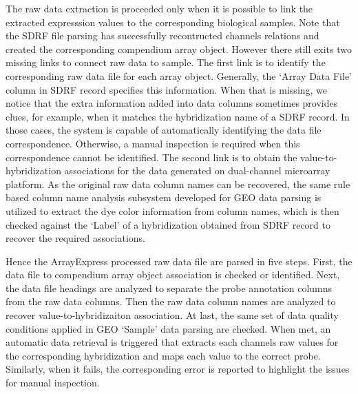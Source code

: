 The raw data extraction is proceeded only when it is possible to link the
extracted expresssion values to the corresponding biological samples.
%
Note that the SDRF file parsing has successfully recontructed channels
relations and created the corresponding compendium array object.
%
However there still exits two missing links to connect raw data to sample.
%
The first link is to identify the corresponding raw data file for each array
object.  Generally, the `Array Data File' column in SDRF record specifies
this information.
%
When that is missing, we notice that the extra information added into
data columns sometimes provides clues, for example, when it matches the
hybridization name of a SDRF record.
%
In those cases, the system is capable of automatically identifying the data
file correspondence.
%
Otherwise, a manual inspection is required when this correspondence cannot be
identified.
%
The second link is to obtain the value-to-hybridization associations for the
data generated on dual-channel microarray platform.
%
As the original raw data column names can be recovered, the same rule based
column name analysis subsystem developed for GEO data parsing is utilized to
extract the dye color information from column names, which is then checked
against the `Label' of a hybridization obtained from SDRF record to recover
the required associations.

Hence the ArrayExpress processed raw data file are parsed in five steps.
%
First, the data file to compendium array object association is checked or
identified.  Next, the data file headings are analyzed to separate the probe
annotation columns from the raw data columns.  Then the raw data column names
are analyzed to recover value-to-hybridizaiton association.  At last, the same
set of data quality conditions applied in GEO `Sample' data parsing are
checked.  When met, an automatic data retrieval is triggered that extracts
each channels raw values for the corresponding hybridization and maps each
value to the correct probe.
%
Similarly, when it fails, the corresponding error is reported to highlight the
issues for manual inspection.



